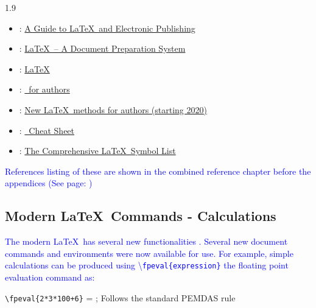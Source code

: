 \documentclass[phd]{ndsu-thesis-2022}
\newcommand\myspacing{1.9}      %
\newcommand\italk[1]{\textcolor{blue}{#1}}  %
\newcommand\cmd[1]{\textbackslash\texttt{#1}}  %
\begin{document}
\begin{spacing}{\myspacing}
\begin{itemize}
\item \citet{kopka2004guide}:  \textcolor{magenta}{\href{https://www.math.ucdavis.edu/~tracy/courses/math129/Guide_To_LaTeX.pdf}
{A Guide to \LaTeX\ and Electronic Publishing}}

\item \citet{lamport94}: \textcolor{magenta}{\href{https://www.pearson.com/us/higher-education/program/Lamport-La-Te-X-A-Document-Preparation-System-2nd-Edition/PGM159713.html}
{\LaTeX\ -- A Document Preparation System}}

\item \citet{Wikibook2016}: \textcolor{magenta}{\href{http://upload.wikimedia.org/wikipedia/commons/2/2d/LaTeX.pdf}
{LaTeX}}

\item \citet{latxprojteam20}: \textcolor{magenta}{\href{https://www.latex-project.org/help/documentation/usrguide.pdf}
{\LaTeXe\ for authors}}

\item \citet{latxprojteam22}: \textcolor{magenta}{\href{https://www.latex-project.org/help/documentation/usrguide3.pdf}
{New \LaTeX\ methods for authors (starting 2020)}}

\item \citet{Chang2014cheat}: \textcolor{magenta}{\href{https://wch.github.io/latexsheet/latexsheet.pdf}
{\LaTeXe\ Cheat Sheet}}

\item \citet{pakin2021comp}: \textcolor{magenta}{\href{https://tug.ctan.org/info/symbols/comprehensive/symbols-a4.pdf}
{The Comprehensive \LaTeX\ Symbol List}}
\end{itemize}

\italk{References listing of these are shown in the combined reference chapter before the appendices (See page: \pageref{biblio})}

\subsection{Modern \LaTeX\ Commands - Calculations}
\italk{The modern \LaTeX\ has several new functionalities \citep{latxprojteam22}. Several new document commands and environments were now available for use.  For example, simple calculations can be produced using \cmd{fpeval\{expression\}} the floating point evaluation command as:}

\verb|\fpeval{2*3*100+6}| = ; \hspace{0.15in} Follows the standard PEMDAS rule


\end{spacing}
\end{document}
